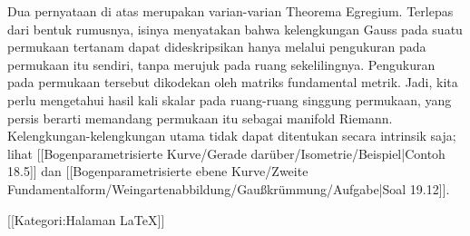 Dua pernyataan di atas merupakan varian-varian Theorema Egregium. Terlepas dari bentuk rumusnya, isinya menyatakan bahwa kelengkungan Gauss pada suatu permukaan tertanam dapat dideskripsikan hanya melalui pengukuran pada permukaan itu sendiri, tanpa merujuk pada ruang sekelilingnya. Pengukuran pada permukaan tersebut dikodekan oleh matriks fundamental metrik. Jadi, kita perlu mengetahui hasil kali skalar pada ruang-ruang singgung permukaan, yang persis berarti memandang permukaan itu sebagai manifold Riemann. Kelengkungan-kelengkungan utama tidak dapat ditentukan secara intrinsik saja; lihat
[[Bogenparametrisierte Kurve/Gerade darüber/Isometrie/Beispiel|Contoh 18.5]]
dan
[[Bogenparametrisierte ebene Kurve/Zweite Fundamentalform/Weingartenabbildung/Gaußkrümmung/Aufgabe|Soal 19.12]].

 [[Kategori:Halaman LaTeX]]
